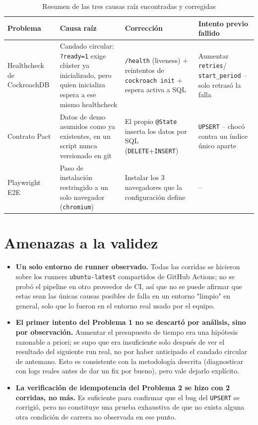 \documentclass[11pt,letterpaper]{article}
\begin{document}
\begin{table}[H]
\centering
\caption{Resumen de las tres causas raíz encontradas y corregidas}
\begin{tabular}{@{}p{2.6cm}p{4.6cm}p{4.4cm}p{2.6cm}@{}}
\toprule
\textbf{Problema} & \textbf{Causa raíz} & \textbf{Corrección} & \textbf{Intento previo fallido} \\
\midrule
Healthcheck de CockroachDB & Candado circular: \texttt{?ready=1} exige clúster ya inicializado,
pero quien inicializa espera a ese mismo healthcheck & \texttt{/health} (liveness) + reintentos
de \texttt{cockroach init} + espera activa a SQL & Aumentar \texttt{retries}/
\texttt{start\_period} -- solo retrasó la falla \\
\addlinespace
Contrato Pact & Datos de demo asumidos como ya existentes, en un script nunca versionado en git &
El propio \texttt{@State} inserta los datos por SQL (\texttt{DELETE}+\texttt{INSERT}) &
\texttt{UPSERT} -- chocó contra un índice único aparte \\
\addlinespace
Playwright E2E & Paso de instalación restringido a un solo navegador (\texttt{chromium}) &
Instalar los 3 navegadores que la configuración define & -- \\
\bottomrule
\end{tabular}
\end{table}

\section{Amenazas a la validez}

\begin{itemize}[leftmargin=1.2em]
  \item \textbf{Un solo entorno de runner observado.} Todas las corridas se hicieron sobre los
  runners \texttt{ubuntu-latest} compartidos de GitHub Actions; no se probó el pipeline en otro
  proveedor de CI, así que no se puede afirmar que estas sean las únicas causas posibles de falla
  en un entorno "limpio" en general, solo que lo fueron en el entorno real usado por el equipo.
  \item \textbf{El primer intento del Problema 1 no se descartó por análisis, sino por
  observación.} Aumentar el presupuesto de tiempo era una hipótesis razonable a priori; se supo
  que era insuficiente solo después de ver el resultado del siguiente run real, no por haber
  anticipado el candado circular de antemano. Esto es consistente con la metodología descrita
  (diagnosticar con logs reales antes de dar un fix por bueno), pero vale dejarlo explícito.
  \item \textbf{La verificación de idempotencia del Problema 2 se hizo con 2 corridas, no más.}
  Es suficiente para confirmar que el bug del \texttt{UPSERT} se corrigió, pero no constituye una
  prueba exhaustiva de que no exista alguna otra condición de carrera no observada en ese punto.
\end{itemize}
\end{document}

